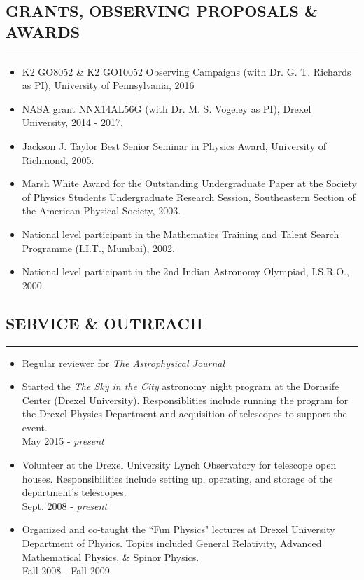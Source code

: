 \documentclass[10pt,a4]{article}
\newcounter{mySaveCounter}
\newcommand\myEnumReset{\setcounter{mySaveCounter}{0}}
\begin{document}
\subsection*{GRANTS, OBSERVING PROPOSALS \& AWARDS}
\hrule  height 4pt
\vspace{0.2cm}
\begin{itemize}
  \item K2 GO8052 \& K2 GO10052 Observing Campaigns (with Dr. G. T. Richards as PI), University of Pennsylvania, 2016
  \item NASA grant NNX14AL56G (with Dr. M. S. Vogeley as PI), Drexel University, 2014 - 2017.
	\item Jackson J. Taylor Best Senior Seminar in Physics Award, University of Richmond, 2005.
  \item Marsh White Award for the Outstanding Undergraduate Paper at the Society of Physics Students Undergraduate Research Session, Southeastern Section of the American Physical Society, 2003.
	\item National level participant in the Mathematics Training and Talent Search Programme (I.I.T., Mumbai), 2002.
	\item National level participant in the 2nd Indian Astronomy Olympiad, I.S.R.O., 2000.
\end{itemize}
\myEnumReset


\subsection*{SERVICE \& OUTREACH}
\hrule  height 4pt
\vspace{0.2cm}
\begin{itemize}
  \item Regular reviewer for {\it The Astrophysical Journal}
	\item Started the \textit{The Sky in the City} astronomy night program
	at the Dornsife Center (Drexel University). Responsiblities include
	running the program for the Drexel Physics Department and acquisition
	of telescopes to support the event. \\
	May 2015 - {\it present}
	\item Volunteer at the Drexel University Lynch Observatory for
          telescope open houses. Responsibilities include setting up,
          operating, and storage of the department's telescopes. \\
          Sept. 2008 - {\it present}
	\item Organized and co-taught the ``Fun Physics" lectures at
	Drexel University Department of Physics. Topics included General
	Relativity, Advanced Mathematical Physics, \& Spinor Physics. \\
	Fall 2008 - Fall 2009
\end{itemize}
\myEnumReset
\end{document}
